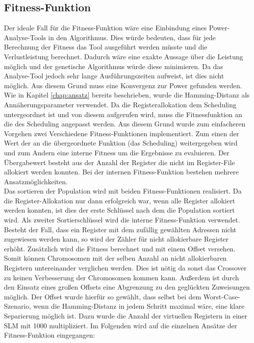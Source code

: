 \subsection{Fitness-Funktion}
\label{chap:Fitness-Funktion}
Der ideale Fall für die Fitness-Funktion wäre eine Einbindung eines Power-Analyse-Tools in den Algorithmus. Dies würde bedeuten, dass für jede Berechnung der Fitness das Tool ausgeführt werden müsste und die Verlustleistung berechnet. Dadurch wäre eine exakte Aussage über die Leistung möglich und der genetische Algorithmus würde diese minimieren. Da das Analyse-Tool jedoch sehr lange Ausführungszeiten aufweist, ist dies nicht möglich. Aus diesem Grund muss eine Konvergenz zur Power gefunden werden.\\
Wie in Kapitel \ref{chap:ansatz} bereits beschrieben, wurde die Hamming-Distanz als Annäherungsparameter verwendet. Da die Registerallokation dem Scheduling untergeordnet ist und von diesem aufgerufen wird, muss die Fitnessfunktion an die des Scheduling angepasst werden. Aus diesem Grund wurde zum einfacheren Vorgehen zwei Verschiedene Fitness-Funktionen implementiert. Zum einen der Wert der an die übergeordnete Funktion (das Scheduling) weitergegeben wird und zum Andern eine interne Fitness um die Ergebnisse zu evaluieren.
Der Übergabewert besteht aus der Anzahl der Register die nicht im Register-File allokiert werden konnten. Bei der internen Fitness-Funktion bestehen mehrere Ansatzmöglichkeiten.\\
Das sortieren der Population wird mit beiden Fitness-Funktionen realisiert. Da die Register-Allokation nur dann erfolgreich war, wenn alle Register allokiert werden konnten, ist dies der erste Schlüssel nach dem die Population sortiert wird. Als zweiter Sortierschlüssel wird die interne Fitness-Funktion verwendet.
Besteht der Fall, dass ein Register mit dem zufällig gewählten Adressen nicht zugewiesen werden kann, so wird der Zähler für nicht allokierbare Register erhöht. Zusätzlich wird die Fitness berechnet und mit einem Offset versehen. Somit können Chromosomen mit der selben Anzahl an nicht allokierbaren Registern untereinander verglichen werden. Dies ist nötig da sonst das Crossover zu keinen Verbesserung der Chromosomen kommen kann. Außerdem ist durch den Einsatz eines großen Offsets eine Abgrenzung zu den geglückten Zuweisungen möglich. Der Offset wurde hierfür  so gewählt, dass selbst bei dem Worst-Case-Szenario, wenn die Hamming-Distanz in jedem Schritt maximal wäre, eine klare Separierung möglich ist. Dazu wurde die Anzahl der virtuellen Registern in einer SLM mit 1000 multipliziert.
Im Folgenden wird auf die einzelnen Ansätze der Fitness-Funktion eingegangen:

